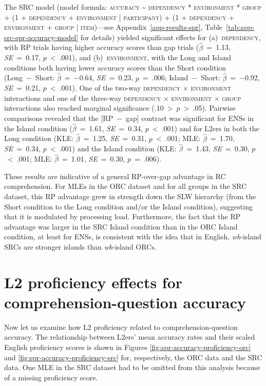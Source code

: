 The SRC model (model formula: \textsc{accuracy \~{} dependency * environment * group + (1 + dependency + environment | participant) + (1 + dependency + environment + group | item)}---see Appendix~\ref{app-results-spr}, Table~\ref{tab:app-src-spr-accuracy-model} for details) yielded significant effects for (a)~\textsc{dependency}, with RP trials having higher accuracy scores than gap trials ($\hat{\beta}$~=~1.13, \textit{SE}~=~0.17, $p$~<~.001), and (b)~\textsc{environment}, with the Long and Island conditions both having lower accuracy scores than the Short condition (Long~−~Short: $\hat{\beta}$~=~−0.64, \textit{SE}~=~0.23, $p$~=~.006; Island~−~Short: $\hat{\beta}$~=~−0.92, \textit{SE}~=~0.21, $p$~<~.001). One of the two-way \textsc{dependency × environment} interactions and one of the three-way \textsc{dependency × environment × group} interactions also reached marginal significance (.10~>~$p$~>~.05). Pairwise comparisons revealed that the [RP~−~gap] contrast was significant for ENSs in the Island condition ($\hat{\beta}$~=~1.61, \textit{SE}~=~0.34, $p$~<~.001) and for L2ers in both the Long condition (KLE: $\hat{\beta}$~=~1.25, \textit{SE}~=~0.31, $p$~<~.001; MLE: $\hat{\beta}$~=~1.70, \textit{SE}~=~0.34, $p$~<~.001) and the Island condition (KLE: $\hat{\beta}$~=~1.43, \textit{SE}~=~0.30, $p$~<~.001; MLE: $\hat{\beta}$~=~1.01, \textit{SE}~=~0.30, $p$~=~.006). 

These results are indicative of a general RP-over-gap advantage in RC comprehension. For MLEs in the ORC dataset and for all groups in the SRC dataset, this RP advantage grew in strength down the SLW hierarchy (from the Short condition to the Long condition and/or the Island condition), suggesting that it is modulated by processing load. Furthermore, the fact that the RP advantage was larger in the SRC Island condition than in the ORC Island condition, at least for ENSs, is consistent with the idea that in English, \textit{wh}-island SRCs are stronger islands than \textit{wh}-island ORCs.

\section{L2 proficiency effects for comprehension-question accuracy}\label{spr-accuracy-proficiency}

Now let us examine how L2 proficiency related to comprehension-question accuracy. The relationship between L2ers' mean accuracy rates and their scaled English proficiency scores is shown in Figures \ref{fig:spr-accuracy-proficiency-orc} and \ref{fig:spr-accuracy-proficiency-src} for, respectively, the ORC data and the SRC data. One MLE in the SRC dataset had to be omitted from this analysis because of a missing proficiency score.

